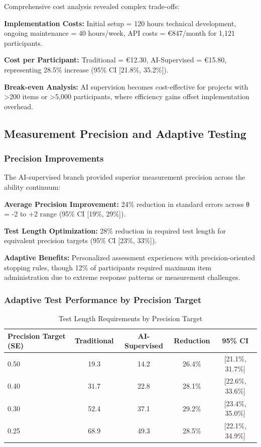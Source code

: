 \documentclass[12pt,a4paper]{article}
\begin{document}
Comprehensive cost analysis revealed complex trade-offs:

\textbf{Implementation Costs:} Initial setup = 120 hours technical development, ongoing maintenance = 40 hours/week, API costs = €847/month for 1,121 participants.

\textbf{Cost per Participant:} Traditional = €12.30, AI-Supervised = €15.80, representing 28.5\% increase (95\% CI [21.8\%, 35.2\%]).

\textbf{Break-even Analysis:} AI supervision becomes cost-effective for projects with >200 items or >5,000 participants, where efficiency gains offset implementation overhead.

\subsection{Measurement Precision and Adaptive Testing}

\subsubsection{Precision Improvements}

The AI-supervised branch provided superior measurement precision across the ability continuum:

\textbf{Average Precision Improvement:} 24\% reduction in standard errors across θ = -2 to +2 range (95\% CI [19\%, 29\%]).

\textbf{Test Length Optimization:} 28\% reduction in required test length for equivalent precision targets (95\% CI [23\%, 33\%]).

\textbf{Adaptive Benefits:} Personalized assessment experiences with precision-oriented stopping rules, though 12\% of participants required maximum item administration due to extreme response patterns or measurement challenges.

\subsubsection{Adaptive Test Performance by Precision Target}

\begin{table}[ht]
\centering
\caption{Test Length Requirements by Precision Target}
\label{tab:adaptive-length}
\begin{tabular}{lcccc}
\toprule
Precision Target (SE) & Traditional & AI-Supervised & Reduction & 95\% CI \\
\midrule
0.50 & 19.3 & 14.2 & 26.4\% & [21.1\%, 31.7\%] \\
0.40 & 31.7 & 22.8 & 28.1\% & [22.6\%, 33.6\%] \\
0.30 & 52.4 & 37.1 & 29.2\% & [23.4\%, 35.0\%] \\
0.25 & 68.9 & 49.3 & 28.5\% & [22.1\%, 34.9\%] \\
\bottomrule
\end{tabular}
\end{table}
\end{document}
